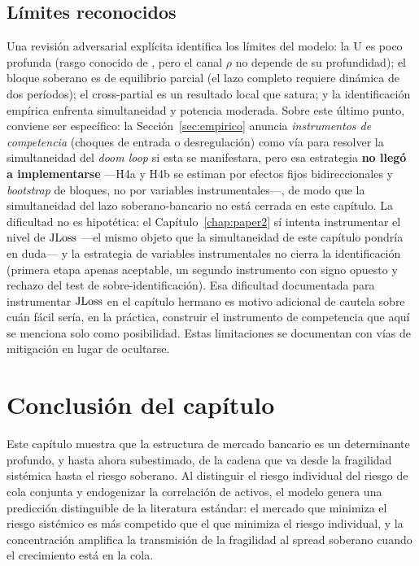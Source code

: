 \subsection{Límites reconocidos}
Una revisión adversarial explícita identifica los límites del modelo: la U es poco profunda (rasgo conocido de \citealp{MMR2010}, pero el canal $\rho$ no depende de su profundidad); el bloque soberano es de equilibrio parcial (el lazo completo requiere dinámica de dos períodos); el cross-partial es un resultado local que satura; y la identificación empírica enfrenta simultaneidad y potencia moderada. Sobre este último punto, conviene ser específico: la Sección~\ref{sec:empirico} anuncia \textit{instrumentos de competencia} (choques de entrada o desregulación) como vía para resolver la simultaneidad del \textit{doom loop} si esta se manifestara, pero esa estrategia \textbf{no llegó a implementarse} —H4a y H4b se estiman por efectos fijos bidireccionales y \textit{bootstrap} de bloques, no por variables instrumentales—, de modo que la simultaneidad del lazo soberano-bancario no está cerrada en este capítulo. La dificultad no es hipotética: el Capítulo~\ref{chap:paper2} sí intenta instrumentar el nivel de $\mathrm{JLoss}$ —el mismo objeto que la simultaneidad de este capítulo pondría en duda— y la estrategia de variables instrumentales no cierra la identificación (primera etapa apenas aceptable, un segundo instrumento con signo opuesto y rechazo del test de sobre-identificación). Esa dificultad documentada para instrumentar $\mathrm{JLoss}$ en el capítulo hermano es motivo adicional de cautela sobre cuán fácil sería, en la práctica, construir el instrumento de competencia que aquí se menciona solo como posibilidad. Estas limitaciones se documentan con vías de mitigación en lugar de ocultarse.

\section{Conclusión del capítulo}\label{sec:conclusion}

Este capítulo muestra que la estructura de mercado bancario es un determinante profundo, y hasta ahora subestimado, de la cadena que va desde la fragilidad sistémica hasta el riesgo soberano. Al distinguir el riesgo individual del riesgo de cola conjunta y endogenizar la correlación de activos, el modelo genera una predicción distinguible de la literatura estándar: el mercado que minimiza el riesgo sistémico es más competido que el que minimiza el riesgo individual, y la concentración amplifica la transmisión de la fragilidad al spread soberano cuando el crecimiento está en la cola.

